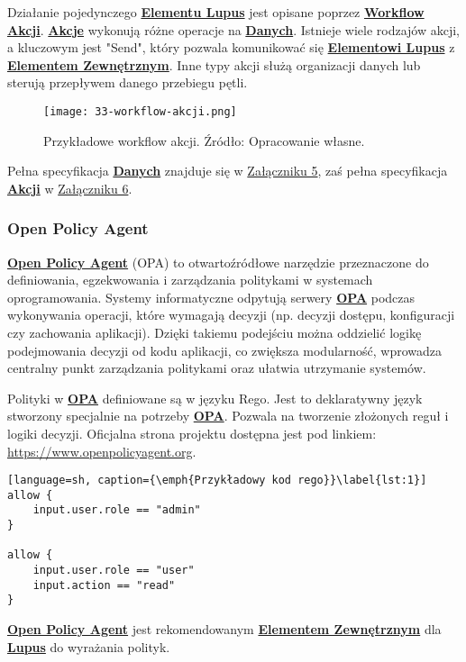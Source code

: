 Działanie pojedynczego \hyperlink{def:element-lupus}{\textbf{Elementu Lupus}} jest opisane poprzez \hyperlink{def:workflow-petli}{\textbf{Workflow Akcji}}. \hyperlink{def:akcja}{\textbf{Akcje}} wykonują różne operacje na \hyperlink{def:dane}{\textbf{Danych}}. Istnieje wiele rodzajów akcji, a kluczowym jest "Send", który pozwala komunikować się \hyperlink{def:element-lupus}{\textbf{Elementowi Lupus}} z \hyperlink{def:element-zewnetrzny}{\textbf{Elementem Zewnętrznym}}. Inne typy akcji służą organizacji danych lub sterują przepływem danego przebiegu pętli.

\begin{figure}[!h]
    \centering \texttt{[image: 33-workflow-akcji.png]}
    \caption{Przykładowe workflow akcji. Źródło: Opracowanie własne.}\label{fig:33-workflow-akcji}
\end{figure}

Pełna specyfikacja \hyperlink{def:dane}{\textbf{Danych}} znajduje się w \hyperref[appendix:5]{Załączniku 5}, zaś pełna specyfikacja \hyperlink{def:akcja}{\textbf{Akcji}} w \hyperref[appendix:6]{Załączniku 6}.

\subsubsection{Open Policy Agent}

\hyperlink{def:opa}{\textbf{Open Policy Agent}} (OPA) to otwartoźródłowe narzędzie przeznaczone do definiowania, egzekwowania i zarządzania politykami w systemach oprogramowania. Systemy informatyczne odpytują serwery \hyperlink{def:opa}{\textbf{OPA}} podczas wykonywania operacji, które wymagają decyzji (np. decyzji dostępu, konfiguracji czy zachowania aplikacji). Dzięki takiemu podejściu można oddzielić logikę podejmowania decyzji od kodu aplikacji, co zwiększa modularność, wprowadza centralny punkt zarządzania politykami oraz ułatwia utrzymanie systemów.

Polityki w \hyperlink{def:opa}{\textbf{OPA}} definiowane są w języku Rego. Jest to deklaratywny język stworzony specjalnie na potrzeby \hyperlink{def:opa}{\textbf{OPA}}. Pozwala na tworzenie złożonych reguł i logiki decyzji. Oficjalna strona projektu dostępna jest pod linkiem: \url{https://www.openpolicyagent.org}.

\begin{lstlisting}[language=sh, caption={\emph{Przykładowy kod rego}}\label{lst:1}]
allow {
    input.user.role == "admin"
}

allow {
    input.user.role == "user"
    input.action == "read"
}
\end{lstlisting}

\hyperlink{def:opa}{\textbf{Open Policy Agent}} jest rekomendowanym \hyperlink{def:element-zewnetrzny}{\textbf{Elementem Zewnętrznym}} dla \hyperlink{def:lupus}{\textbf{Lupus}} do wyrażania polityk.